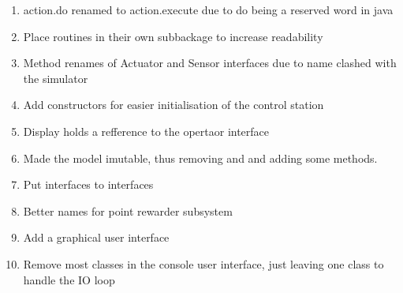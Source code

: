\begin{enumerate}
    \item action.do renamed to action.execute due to do being a reserved word in java
    \item Place routines in their own subbackage to increase readability
    \item Method renames of Actuator and Sensor interfaces due to name clashed with the simulator
    \item Add constructors for easier initialisation of the control station
    \item Display holds a refference to the opertaor interface
    \item Made the model imutable, thus removing and and adding some methods.
    \item Put interfaces to interfaces
    \item Better names for point rewarder subsystem
    \item Add a graphical user interface
    \item Remove most classes in the console user interface, just leaving one class to handle the IO loop
\end{enumerate}